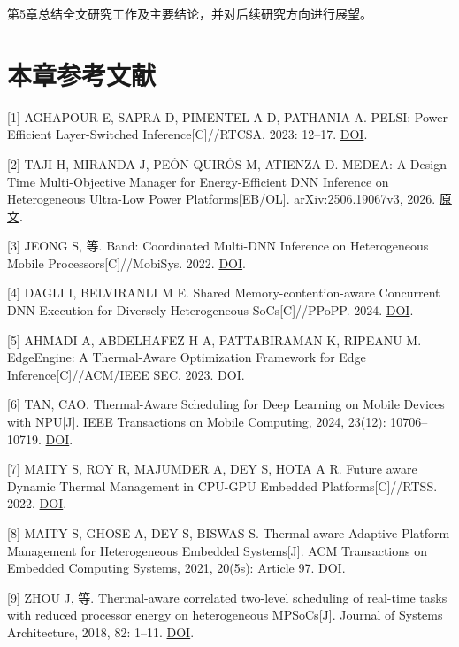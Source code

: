 第5章总结全文研究工作及主要结论，并对后续研究方向进行展望。

\section*{本章参考文献}

{[}1{]} AGHAPOUR E, SAPRA D, PIMENTEL A D, PATHANIA A. PELSI: Power-Efficient Layer-Switched Inference{[}C{]}//RTCSA. 2023: 12--17. \href{https://doi.org/10.1109/RTCSA58653.2023.00011}{DOI}.

{[}2{]} TAJI H, MIRANDA J, PEÓN-QUIRÓS M, ATIENZA D. MEDEA: A Design-Time Multi-Objective Manager for Energy-Efficient DNN Inference on Heterogeneous Ultra-Low Power Platforms{[}EB/OL{]}. arXiv:2506.19067v3, 2026. \href{https://arxiv.org/abs/2506.19067}{原文}.

{[}3{]} JEONG S, 等. Band: Coordinated Multi-DNN Inference on Heterogeneous Mobile Processors{[}C{]}//MobiSys. 2022. \href{https://doi.org/10.1145/3498361.3538948}{DOI}.

{[}4{]} DAGLI I, BELVIRANLI M E. Shared Memory-contention-aware Concurrent DNN Execution for Diversely Heterogeneous SoCs{[}C{]}//PPoPP. 2024. \href{https://doi.org/10.1145/3627535.3638502}{DOI}.

{[}5{]} AHMADI A, ABDELHAFEZ H A, PATTABIRAMAN K, RIPEANU M. EdgeEngine: A Thermal-Aware Optimization Framework for Edge Inference{[}C{]}//ACM/IEEE SEC. 2023. \href{https://doi.org/10.1145/3583740.3626616}{DOI}.

{[}6{]} TAN, CAO. Thermal-Aware Scheduling for Deep Learning on Mobile Devices with NPU{[}J{]}. IEEE Transactions on Mobile Computing, 2024, 23(12): 10706--10719. \href{https://doi.org/10.1109/TMC.2024.3379501}{DOI}.

{[}7{]} MAITY S, ROY R, MAJUMDER A, DEY S, HOTA A R. Future aware Dynamic Thermal Management in CPU-GPU Embedded Platforms{[}C{]}//RTSS. 2022. \href{https://doi.org/10.1109/RTSS55097.2022.00041}{DOI}.

{[}8{]} MAITY S, GHOSE A, DEY S, BISWAS S. Thermal-aware Adaptive Platform Management for Heterogeneous Embedded Systems{[}J{]}. ACM Transactions on Embedded Computing Systems, 2021, 20(5s): Article 97. \href{https://doi.org/10.1145/3477028}{DOI}.

{[}9{]} ZHOU J, 等. Thermal-aware correlated two-level scheduling of real-time tasks with reduced processor energy on heterogeneous MPSoCs{[}J{]}. Journal of Systems Architecture, 2018, 82: 1--11. \href{https://doi.org/10.1016/j.sysarc.2017.09.007}{DOI}.

